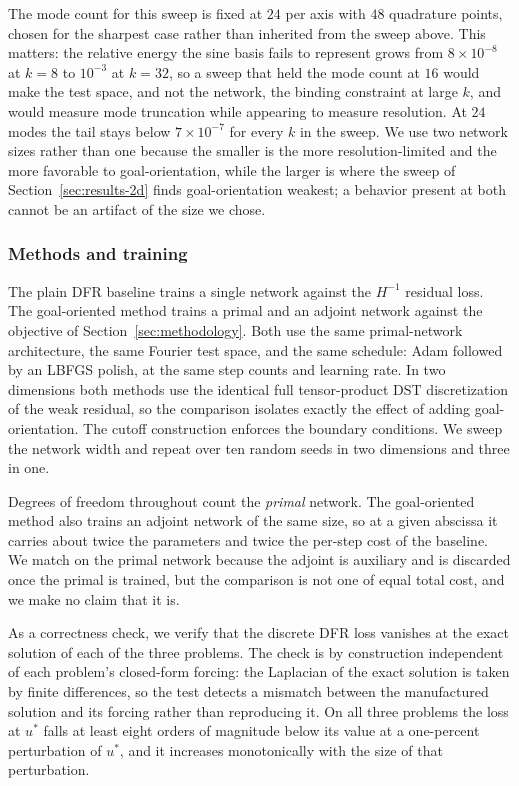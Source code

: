 \documentclass[preprint,11pt]{elsarticle}
\begin{document}
The mode count for this sweep is fixed at $24$ per axis with $48$ quadrature points, chosen for the sharpest case rather than inherited from the sweep above. This matters: the relative energy the sine basis fails to represent grows from $8 \times 10^{-8}$ at $k = 8$ to $10^{-3}$ at $k = 32$, so a sweep that held the mode count at $16$ would make the test space, and not the network, the binding constraint at large $k$, and would measure mode truncation while appearing to measure resolution. At $24$ modes the tail stays below $7 \times 10^{-7}$ for every $k$ in the sweep. We use two network sizes rather than one because the smaller is the more resolution-limited and the more favorable to goal-orientation, while the larger is where the sweep of Section~\ref{sec:results-2d} finds goal-orientation weakest; a behavior present at both cannot be an artifact of the size we chose.

\subsubsection{Methods and training}

The plain DFR baseline trains a single network against the $H^{-1}$ residual loss. The goal-oriented method trains a primal and an adjoint network against the objective of Section~\ref{sec:methodology}. Both use the same primal-network architecture, the same Fourier test space, and the same schedule: Adam followed by an LBFGS polish, at the same step counts and learning rate. In two dimensions both methods use the identical full tensor-product DST discretization of the weak residual, so the comparison isolates exactly the effect of adding goal-orientation. The cutoff construction enforces the boundary conditions. We sweep the network width and repeat over ten random seeds in two dimensions and three in one.

Degrees of freedom throughout count the \emph{primal} network. The goal-oriented method also trains an adjoint network of the same size, so at a given abscissa it carries about twice the parameters and twice the per-step cost of the baseline. We match on the primal network because the adjoint is auxiliary and is discarded once the primal is trained, but the comparison is not one of equal total cost, and we make no claim that it is.

As a correctness check, we verify that the discrete DFR loss vanishes at the exact solution of each of the three problems. The check is by construction independent of each problem's closed-form forcing: the Laplacian of the exact solution is taken by finite differences, so the test detects a mismatch between the manufactured solution and its forcing rather than reproducing it. On all three problems the loss at $u^*$ falls at least eight orders of magnitude below its value at a one-percent perturbation of $u^*$, and it increases monotonically with the size of that perturbation.
\end{document}

